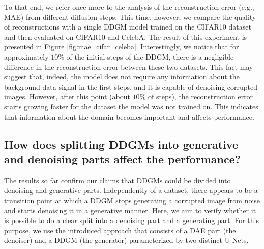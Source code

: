 To that end, we refer once more to the analysis of the reconstruction error (e.g., MAE) from different diffusion steps. This time, however, we compare the quality of reconstructions with a single DDGM model trained on the CIFAR10 dataset and then evaluated on CIFAR10 and CelebA. The result of this experiment is presented in Figure \ref{fig:mae_cifar_celeba}. Interestingly, we notice that for approximately $10\%$ of the initial steps of the DDGM, there is a negligible difference in the reconstruction error between these two datasets. This fact may suggest that, indeed, the model does not require any information about the background data signal in the first steps, and it is capable of denoising corrupted images. However, after this point (about $10\%$ of steps), the reconstruction error starts growing faster for the dataset the model was not trained on. This indicates that information about the domain becomes important and affects performance.

\subsection{How does splitting DDGMs into generative and denoising parts affect the performance?}

The results so far confirm our claims that DDGMs could be divided into denoising and generative parts. Independently of a dataset, there appears to be a transition point at which a DDGM stops generating a corrupted image from noise and starts denoising it in a generative manner. Here, we aim to verify whether it is possible to do a clear split into a denoising part and a generating part. For this purpose, we use the introduced \ours{} approach that consists of a DAE part (the denoiser) and a DDGM (the generator) parameterized by two distinct U-Nets. 

